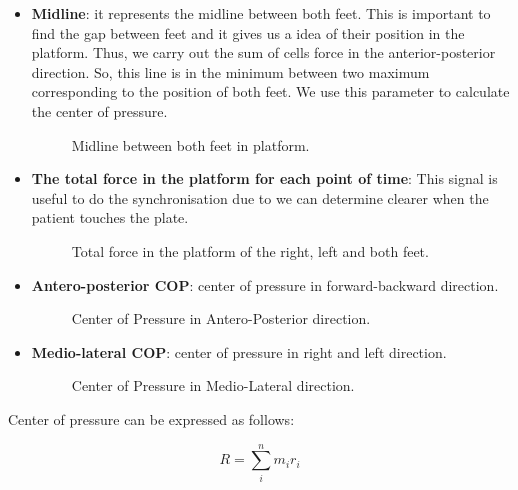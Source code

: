 \begin{itemize}
	\item \textbf{Midline}: it represents the midline between both feet. This is important to find the gap between feet and it gives us a idea of their position in the platform. Thus, we carry out the sum of cells force in the anterior-posterior direction. So, this line is in the minimum between two maximum corresponding to the position of both feet. We use this parameter to calculate the center of pressure.
	\begin{figure}[H]
		\centering
		\caption{Midline between both feet in platform.}
		\label{fig:midlineForceplate}
	\end{figure}
	
	\item \textbf{The total force in the platform for each point of time}: This signal is useful to do the synchronisation due to we can determine clearer when the patient touches the plate.
		\begin{figure}[H]
			\centering
			\caption{Total force in the platform of the right, left and both feet.}
			\label{fig:forceFP}
		\end{figure}
	
	\item \textbf{Antero-posterior COP}: center of pressure in forward-backward direction.
		\begin{figure}[H]
			\centering
			\caption{Center of Pressure in Antero-Posterior direction.}
			\label{fig:APCOP}
		\end{figure}	
	
	\item \textbf{Medio-lateral  COP}: center of pressure  in right and left direction.
			\begin{figure}[H]
				\centering
				\caption{Center of Pressure in Medio-Lateral direction.}
				\label{fig:MLCOP}
			\end{figure}
	
\end{itemize}

Center of pressure can be expressed as follows:

\begin{equation}
	\label{COP}
	R=\sum_{i}^{n}m_{i}r_{i}
\end{equation}


